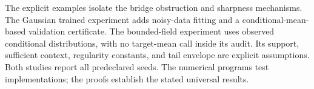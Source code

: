 The explicit examples isolate the bridge obstruction and sharpness mechanisms. The Gaussian trained experiment adds noisy-data fitting and a conditional-mean-based validation certificate. The bounded-field experiment uses observed conditional distributions, with no target-mean call inside its audit. Its support, sufficient context, regularity constants, and tail envelope are explicit assumptions. Both studies report all predeclared seeds. The numerical programs test implementations; the proofs establish the stated universal results.
